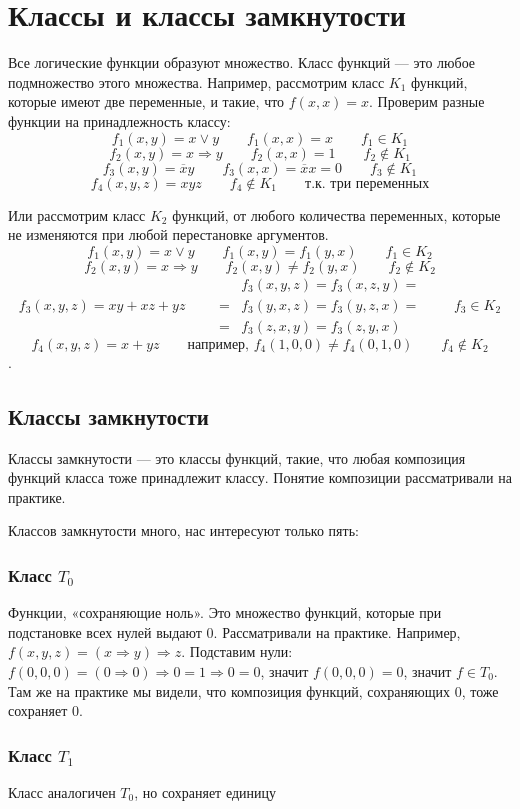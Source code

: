 \documentclass{article}
\newcommand{\impl}{\Rightarrow}
\renewcommand{\lor}{\vee}
\newcommand{\lne}[1]{\overline{#1}}
\begin{document}
    \section{Классы и классы замкнутости}
    Все логические функции образуют множество.
    Класс функций — это любое подмножество этого множества.
    Например, рассмотрим класс $K_1$ функций, которые имеют две переменные, и такие, что $f(x, x) = x$.
    Проверим разные функции на принадлежность классу:
    \[f_1(x, y) = x \lor y \qquad f_1(x,x) = x \qquad f_1\in K_1\]
    \[f_2(x, y) = x \impl y \qquad f_2(x,x) = 1 \qquad f_2 \notin K_1\]
    \[f_3(x, y) = \lne x y \qquad f_3(x,x) = \lne xx = 0 \qquad f_3 \notin K_1\]
    \[f_4(x, y, z) = xyz \qquad f_4 \notin K_1 \qquad \text{т.к. три переменных}\]

    Или рассмотрим класс $K_2$ функций, от любого количества переменных, которые не изменяются при любой перестановке аргументов.
    \[f_1(x, y) = x \lor y \qquad f_1(x, y)=f_1(y, x) \qquad f_1\in K_2\]
    \[f_2(x, y) = x \impl y \qquad f_2(x, y)\ne f_2(y, x) \qquad f_2\notin K_2\]
    \[f_3(x, y, z) = xy+xz+yz \qquad \begin{split}&f_3(x, y, z)=f_3(x, z, y)=\\=&f_3(y, x, z)=f_3(y, z, x)=\\=&f_3(z, x, y)=f_3(z, y, x)\end{split} \qquad f_3\in K_2\]
    \[f_4(x, y, z) = x + yz\qquad \text{например, } f_4(1, 0, 0)\ne f_4(0, 1, 0)\qquad f_4\notin K_2\].

    \subsection{Классы замкнутости}
    Классы замкнутости — это классы функций, такие, что любая композиция функций класса тоже принадлежит классу.
    Понятие композиции рассматривали на практике.

    Классов замкнутости много, нас интересуют только пять:
    \subsubsection{Класс $T_0$}
    Функции, «сохраняющие ноль». Это множество функций, которые при подстановке всех нулей выдают 0. Рассматривали на практике. Например,
    $f(x, y, z)=(x \impl y) \impl z$. Подставим нули: $f(0, 0, 0)=(0 \impl 0) \impl 0 = 1 \impl 0 = 0$, значит
    $f(0, 0, 0)=0$, значит $f\in T_0$. Там же на практике мы видели, что композиция функций, сохраняющих 0, тоже
    сохраняет 0.
    \subsubsection{Класс $T_1$}
    Класс аналогичен $T_0$, но сохраняет единицу
\end{document}
